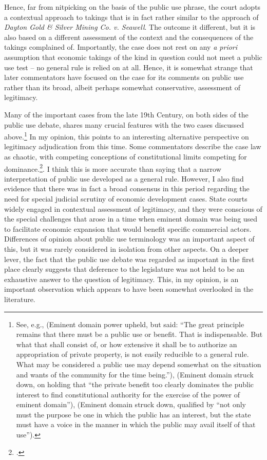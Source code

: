 \documentclass[12pt,a4paper]{book} %
\begin{document}
Hence, far from nitpicking on the basis of the public use phrase, the court adopts a contextual approach to takings that is in fact rather similar to the approach of {\it Dayton Gold \& Silver Mining Co. v. Seawell}. The outcome it different, but it is also based on a different assessment of the context and the consequences of the takings complained of. Importantly, the case does not rest on any {\it a priori} assumption that economic takings of the kind in question could not meet a public use test -- no general rule is relied on at all. Hence, it is somewhat strange that later commentators have focused on the case for its comments on public use rather than its broad, albeit perhaps somewhat conservative, assessment of legitimacy. 

Many of the important cases from the late 19th Century, on both sides of the public use debate, shares many crucial features with the two cases discussed above.\footnote{See, e.g., \cite{scudder32} (Eminent domain power upheld, but said: ``The great principle remains that there must be a public use or benefit. That is indispensable. But what that shall consist of, or how extensive it shall be to authorize an appropriation of private property, is not easily reducible to a general rule. What may be considered a public use may depend somewhat on the situation and wants of the community for the time being.''), \cite{fallsburg03} (Eminent domain struck down, on holding that ``the private benefit too clearly dominates the public interest to find constitutional authority for the exercise of the power of eminent domain''), \cite[538]{board91} (Eminent domain struck down, qualified by ``not only must the purpose be one in which the public has an interest, but the state must have a voice in the manner in which the public may avail itself of that use'').} In my opinion, this points to an interesting alternative perspective on legitimacy adjudication from this time. Some commentators describe the case law as chaotic, with competing conceptions of constitutional limits competing for dominance.\footcite{berger78,meidinger80}. I think this is more accurate than saying that a narrow interpretation of public use developed as a general rule. However, I also find evidence that there was in fact a broad consensus in this period regarding the need for special judicial scrutiny of economic development cases. State courts widely engaged in contextual assessment of legitimacy, and they were conscious of the special challenges that arose in a time when eminent domain was being used to facilitate economic expansion that would benefit specific commercial actors. Differences of opinion about public use terminology was an important aspect of this, but it was rarely considered in isolation from other aspects. On a deeper lever, the fact that the public use debate was regarded as important in the first place clearly suggests that deference to the legislature was not held to be an exhaustive answer to the question of legitimacy. This, in my opinion, is an important observation which appears to have been somewhat overlooked in the literature. 
\end{document}
